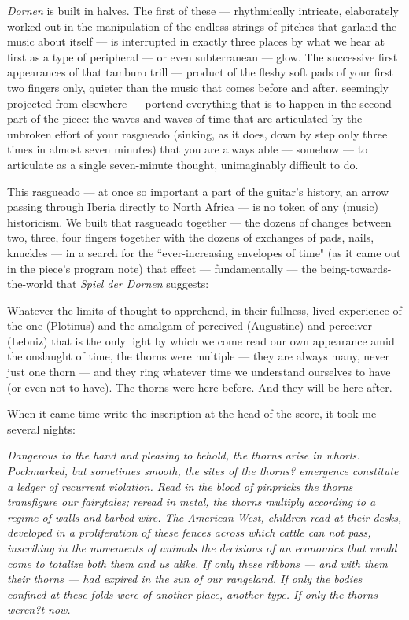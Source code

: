 \documentclass[11pt]{article}
\begin{document}
\textit{Dornen} is built in halves. The first of these --- rhythmically intricate, elaborately worked-out in the manipulation of the endless strings of pitches that garland the music about itself --- is interrupted in exactly three places by what we hear at first as a type of peripheral --- or even subterranean --- glow. The successive first appearances of that tamburo trill --- product of the fleshy soft pads of your first two fingers only, quieter than the music that comes before and after, seemingly projected from elsewhere --- portend everything that is to happen in the second part of the piece: the waves and waves of time that are articulated by the unbroken effort of your rasgueado (sinking, as it does, down by step only three times in almost seven minutes) that you are always able --- somehow --- to articulate as a single seven-minute thought, unimaginably difficult to do.

This rasgueado --- at once so important a part of the guitar's history, an arrow passing through Iberia directly to North Africa --- is no token of any (music) historicism. We built that rasgueado together --- the dozens of changes between two, three, four fingers together with the dozens of exchanges of pads, nails, knuckles --- in a search for the ``ever-increasing envelopes of time" (as it came out in the piece's program note) that effect --- fundamentally --- the being-towards-the-world that \textit{Spiel der Dornen} suggests:

Whatever the limits of thought to apprehend, in their fullness, lived experience of the one (Plotinus) and the amalgam of perceived (Augustine) and perceiver (Lebniz) that is the only light by which we come read our own appearance amid the onslaught of time, the thorns were multiple --- they are always many, never just one thorn --- and they ring whatever time we understand ourselves to have (or even not to have). The thorns were here before. And they will be here after.

When it came time write the inscription at the head of the score, it took me several nights:

\textit{Dangerous to the hand and pleasing to behold, the thorns arise in whorls. Pockmarked, but sometimes smooth, the sites of the thorns? emergence constitute a ledger of recurrent violation. Read in the blood of pinpricks the thorns transfigure our fairytales; reread in metal, the thorns multiply according to a regime of walls and barbed wire. The American West, children read at their desks, developed in a proliferation of these fences across which cattle can not pass, inscribing in the movements of animals the decisions of an economics that would come to totalize both them and us alike. If only these ribbons --- and with them their thorns --- had expired in the sun of our rangeland. If only the bodies confined at these folds were of another place, another type. If only the thorns weren?t now.}
\end{document}
